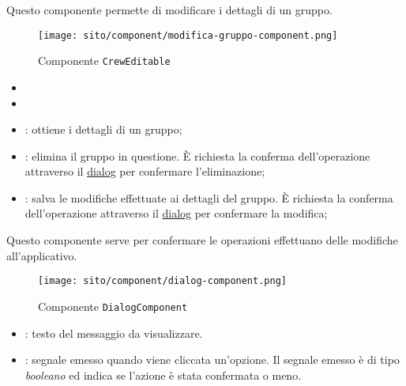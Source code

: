 \label{par:CrewEditable}

Questo componente permette di modificare i dettagli di un gruppo.
\begin{figure}[H]

    \centerline{\texttt{[image: sito/component/modifica-gruppo-component.png]}}

    \caption{Componente \texttt{CrewEditable}}
\end{figure}
\begin{itemize}
    \item {}
    \item {}
\end{itemize}


\begin{itemize}
    \item {}: ottiene i dettagli di un gruppo;
    \item {}: elimina il gruppo in questione. È richiesta la
          conferma dell'operazione attraverso il \hyperref[par:Dialog]{dialog}
          per
          confermare l'eliminazione;
    \item {}: salva le modifiche effettuate ai dettagli del
          gruppo. È richiesta la conferma dell'operazione attraverso il
          \hyperref[par:Dialog]{dialog} per confermare la modifica;
\end{itemize}

\label{par:Dialog}
Questo componente serve per confermare le operazioni effettuano delle modifiche
all'applicativo.

\begin{figure}[H]
    \centering
    \texttt{[image: sito/component/dialog-component.png]}
    \caption{Componente \texttt{DialogComponent}}
\end{figure}

\begin{itemize}
    \item {}: testo del messaggio da visualizzare.
\end{itemize}

\begin{itemize}
    \item {}: segnale emesso quando viene cliccata un'opzione. Il
          segnale emesso è di tipo \textit{booleano} ed indica se l'azione è
          stata
          confermata o meno.
\end{itemize}

